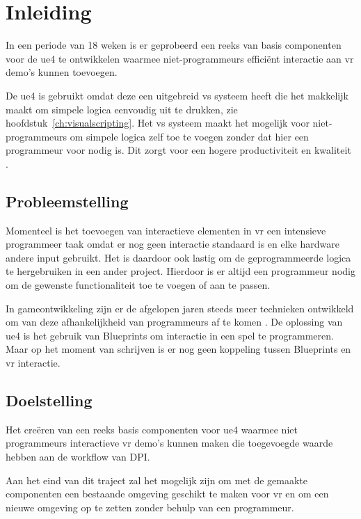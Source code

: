 \chapter{Inleiding}

In een periode van 18 weken is er geprobeerd een reeks van basis componenten voor de \gls{ue4} te ontwikkelen waarmee niet-programmeurs efficiënt interactie aan \gls{vr} demo’s kunnen toevoegen.

De \gls{ue4} is gebruikt omdat deze een uitgebreid \gls{vs} systeem heeft die het makkelijk maakt om simpele logica eenvoudig uit te drukken, zie hoofdstuk~\ref{ch:visualscripting}. Het \gls{vs} systeem maakt het mogelijk voor niet-programmeurs om simpele logica zelf toe te voegen zonder dat hier een programmeur voor nodig is. Dit zorgt voor een hogere productiviteit en kwaliteit \cite{Cutumisu200732}.

\section{Probleemstelling}

Momenteel is het toevoegen van interactieve elementen in \gls{vr} een intensieve programmeer taak omdat er nog geen interactie standaard is en elke hardware andere input gebruikt. Het is daardoor ook lastig om de geprogrammeerde logica te hergebruiken in een ander project. Hierdoor is er altijd een programmeur nodig om de gewenste functionaliteit toe te voegen of aan te passen. 

In gameontwikkeling zijn er de afgelopen jaren steeds meer technieken ontwikkeld om van deze afhankelijkheid van programmeurs af te komen \cite{Cutumisu200732, ambientbehav}. De oplossing van \gls{ue4} is het gebruik van Blueprints om interactie in een spel te programmeren. Maar op het moment van schrijven is er nog geen koppeling tussen Blueprints en \gls{vr} interactie.

\section{Doelstelling}

Het creëren van een reeks basis componenten voor \gls{ue4} waarmee niet programmeurs interactieve \gls{vr} demo’s kunnen maken die toegevoegde waarde hebben aan de workflow van DPI.

Aan het eind van dit traject zal het mogelijk zijn om met de gemaakte componenten een bestaande omgeving geschikt te maken voor \gls{vr} en om een nieuwe omgeving op te zetten zonder behulp van een programmeur.

